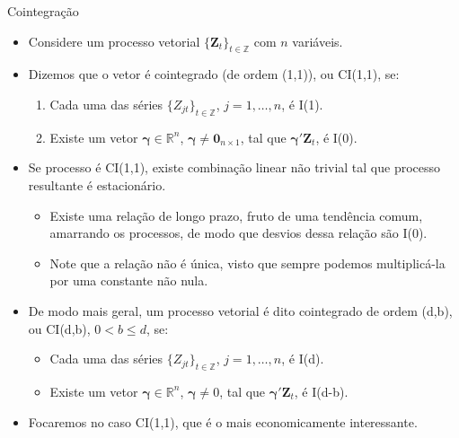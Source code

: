 \documentclass[11pt]{beamer}
\begin{document}
\begin{frame}{Cointegração}
\begin{itemize}
	\item Considere um processo vetorial $\{\boldsymbol{Z}_t\}_{t \in \mathbb{Z}}$ com $n$ variáveis.
	\item Dizemos que o vetor é cointegrado (de ordem (1,1)), ou CI(1,1), se:
	\begin{enumerate}
		\item Cada uma das séries $\{Z_{jt}\}_{t\in \mathbb{Z}}$, $j=1,\ldots, n$, é I(1).
		\item Existe um vetor $\boldsymbol{\gamma} \in \mathbb{R}^n$, $\boldsymbol{\gamma} \neq \boldsymbol{0}_{n\times 1}$, tal que $\boldsymbol{\gamma}'\boldsymbol{Z}_t$, é I(0).
	\end{enumerate} 
	\item Se processo é CI(1,1), existe combinação linear não trivial tal que processo resultante é estacionário.
	\begin{itemize}
		\item Existe uma {\color{blue}relação de longo prazo}, fruto de uma tendência comum, amarrando os processos, de modo que desvios dessa relação são I(0).
		\item Note que a relação não é única, visto que sempre podemos multiplicá-la por uma constante não nula.
	\end{itemize}
	\item De modo mais geral, um processo vetorial é dito cointegrado de ordem (d,b), ou CI(d,b), $ 0< b \leq  d$, se:
	\begin{itemize}
			\item Cada uma das séries $\{Z_{jt}\}_{t\in \mathbb{Z}}$, $j=1,\ldots, n$, é I(d).
					\item Existe um vetor $\boldsymbol{\gamma} \in \mathbb{R}^n$, $\boldsymbol{\gamma} \neq 0$, tal que $\boldsymbol{\gamma}'\boldsymbol{Z}_t$, é I(d-b).
	\end{itemize}
	\item Focaremos no caso CI(1,1), que é o mais economicamente interessante.
\end{itemize}
\end{frame}
\end{document}
